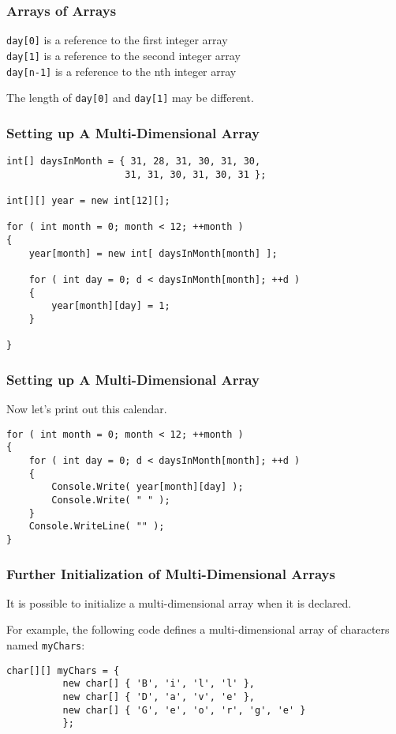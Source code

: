 \begin{frame}
\frametitle{Arrays of Arrays}

\texttt{day[0]} is a reference to the first integer array\\
\texttt{day[1]} is a reference to the second integer array\\
\texttt{day[n-1]} is a reference to the nth integer array


The length of \texttt{day[0]} and \texttt{day[1]} may be different.

\end{frame}

\begin{frame}[fragile]
\frametitle{Setting up A Multi-Dimensional Array}

\begin{verbatim}
int[] daysInMonth = { 31, 28, 31, 30, 31, 30, 
                     31, 31, 30, 31, 30, 31 };

int[][] year = new int[12][];

for ( int month = 0; month < 12; ++month )
{
    year[month] = new int[ daysInMonth[month] ];
	
    for ( int day = 0; d < daysInMonth[month]; ++d )
    {
        year[month][day] = 1;
    }

}
\end{verbatim}

\end{frame}

\begin{frame}[fragile]
\frametitle{Setting up A Multi-Dimensional Array}

Now let's print out this calendar.

\begin{verbatim}
for ( int month = 0; month < 12; ++month )
{
    for ( int day = 0; d < daysInMonth[month]; ++d )
    {
        Console.Write( year[month][day] );
        Console.Write( " " );
    }
    Console.WriteLine( "" );
}
\end{verbatim}

\end{frame}

\begin{frame}[fragile]
\frametitle{Further Initialization of Multi-Dimensional Arrays}
It is possible to initialize a multi-dimensional array when it is declared.

For example, the following code defines a multi-dimensional array of characters named \texttt{myChars}:

\begin{verbatim}
char[][] myChars = {
          new char[] { 'B', 'i', 'l', 'l' },
          new char[] { 'D', 'a', 'v', 'e' },
          new char[] { 'G', 'e', 'o', 'r', 'g', 'e' }
          };
\end{verbatim}

\end{frame}

